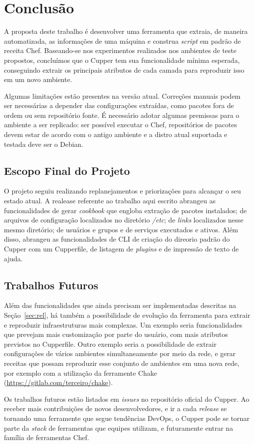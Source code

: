 \newpage\null\thispagestyle{empty}\newpage
\chapter{Conclusão}
\label{chap:conclusao}

A proposta deste trabalho é desenvolver uma ferramenta que extraia, de maneira
automatizada, as informações de uma máquina e construa \textit{script} em padrão
de receita Chef. Baseando-se nos experimentos realizados nos ambientes de teste propostos,
concluímos que o Cupper tem sua funcionalidade mínima esperada, conseguindo
extrair os principais atributos de cada camada para reproduzir isso em um novo ambiente.

Algumas limitações estão presentes na versão atual. Correções manuais podem ser necessárias
a depender das configurações extraídas, como pacotes fora de ordem ou sem repositório fonte.
É necessário adotar algumas premissas para o ambiente a ser replicado: ser possível executar
o Chef, repositórios de pacotes devem estar de acordo com o antigo ambiente e a distro atual
suportada e testada deve ser o Debian.

\section{Escopo Final do Projeto}

O projeto seguiu realizando replanejamentos e priorizações para alcançar o seu estado atual.
A realease referente ao trabalho aqui escrito abrangeu as funcionalidades de gerar 
\textit{cookbook} que engloba extração de pacotes instalados; de arquivos de configuração 
localizados no diretório \textit{/etc}; de \textit{links} localizados nesse mesmo diretório; 
de usuários e grupos e de serviços executados e ativos. Além disso, abrangeu as 
funcionalidades de CLI de criação do direorio padrão do Cupper com um Cupperfile, de listagem
de \textit{plugins} e de impressão de texto de ajuda.

\section{Trabalhos Futuros}

Além das funcionalidades que ainda precisam ser implementadas descritas na Seção~\ref{sec:rel},
há também a possibilidade de evolução da ferramenta para extrair e reproduzir
infraestruturas mais complexas. Um exemplo seria funcionalidades que
prevejam mais customização por parte do usuário, com mais atributos previstos no Cupperfile.
Outro exemplo seria a possibilidade de extrair configurações de vários ambientes simultaneamente
por meio da rede, e gerar receitas que possam reproduzir esse
conjunto de ambientes em uma nova rede, por exemplo com a utilização da ferramente Chake (\url{https://gitlab.com/terceiro/chake}).

Os trabalhos futuros estão listados em \textit{issues} no repositório oficial do Cupper.
Ao receber mais contribuições de novos desenvolvedores, e ir a cada \textit{release} se tornando
uma ferramente que segue tendências DevOps, o Cupper pode se tornar parte da \textit{stack} de ferramentas
que equipes utilizam, e futuramente entrar na família de ferramentas Chef.
